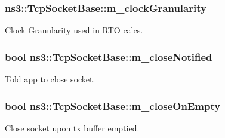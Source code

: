 \subsubsection[{\texorpdfstring{m\+\_\+clock\+Granularity}{m_clockGranularity}}]{ ns3\+::\+Tcp\+Socket\+Base\+::m\+\_\+clock\+Granularity\hspace{0.3cm}{\ttfamily [protected]}}\hypertarget{classns3_1_1TcpSocketBase_a92035196e6807e1430369bdfdead2e46}{}\label{classns3_1_1TcpSocketBase_a92035196e6807e1430369bdfdead2e46}


Clock Granularity used in R\+TO calcs. 

\subsubsection[{\texorpdfstring{m\+\_\+close\+Notified}{m_closeNotified}}]{\setlength{\rightskip}{0pt plus 5cm}bool ns3\+::\+Tcp\+Socket\+Base\+::m\+\_\+close\+Notified\hspace{0.3cm}{\ttfamily [protected]}}\hypertarget{classns3_1_1TcpSocketBase_a8b9716e924553832a827b6efe214b70f}{}\label{classns3_1_1TcpSocketBase_a8b9716e924553832a827b6efe214b70f}


Told app to close socket. 

\subsubsection[{\texorpdfstring{m\+\_\+close\+On\+Empty}{m_closeOnEmpty}}]{\setlength{\rightskip}{0pt plus 5cm}bool ns3\+::\+Tcp\+Socket\+Base\+::m\+\_\+close\+On\+Empty\hspace{0.3cm}{\ttfamily [protected]}}\hypertarget{classns3_1_1TcpSocketBase_a46c12a1d96840292ae2b55c3c2974214}{}\label{classns3_1_1TcpSocketBase_a46c12a1d96840292ae2b55c3c2974214}


Close socket upon tx buffer emptied. 


